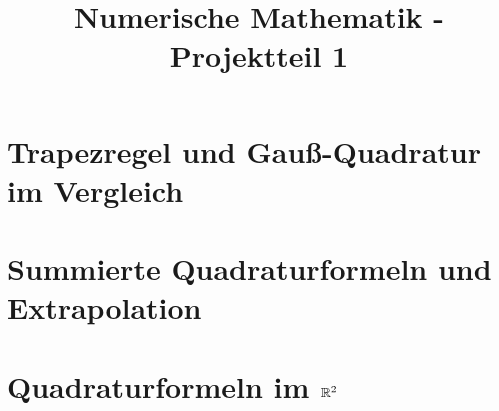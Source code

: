 \documentclass{article}
\title{Numerische Mathematik - Projektteil 1}
\author{}
\date{}
\begin{document}
\maketitle

\section{Trapezregel und Gauß-Quadratur im Vergleich}


\section{Summierte Quadraturformeln und Extrapolation}


\section{Quadraturformeln im $\mathbb R^2$}

\end{document}
